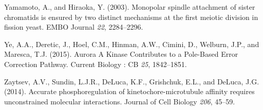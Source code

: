 \documentclass[12pt,a4paper,twoside,openright]{book}
\begin{document}
Yamamoto, A., and Hiraoka, Y. (2003). Monopolar spindle attachment of
sister chromatids is ensured by two distinct mechanisms at the first
meiotic division in fission yeast. EMBO Journal \emph{22}, 2284--2296.

Ye, A.A., Deretic, J., Hoel, C.M., Hinman, A.W., Cimini, D., Welburn,
J.P., and Maresca, T.J. (2015). Aurora A Kinase Contributes to a
Pole-Based Error Correction Pathway. Current Biology : CB \emph{25},
1842--1851.

Zaytsev, A.V., Sundin, L.J.R., DeLuca, K.F., Grishchuk, E.L., and
DeLuca, J.G. (2014). Accurate phosphoregulation of
kinetochore-microtubule affinity requires unconstrained molecular
interactions. Journal of Cell Biology \emph{206}, 45--59.
\end{document}
